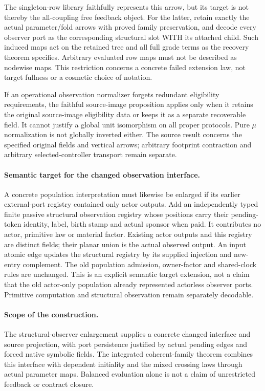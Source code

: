\documentclass{article}
\begin{document}
The singleton-row library faithfully represents this arrow, but its target is not thereby the all-coupling free feedback object. For the latter, retain exactly the actual parameter/fold arrows with proved family preservation, and decode every observer port as the corresponding structural slot WITH its attached child. Such induced maps act on the retained tree and all full grade terms as the recovery theorem specifies. Arbitrary evaluated row maps must not be described as nodewise maps. This restriction concerns a concrete failed extension law, not target fullness or a cosmetic choice of notation.

If an operational observation normalizer forgets redundant eligibility requirements, the faithful source-image proposition applies only when it retains the original source-image eligibility data or keeps it as a separate recoverable field. It cannot justify a global unit isomorphism on all proper protocols. Pure $\mu$ normalization is not globally inverted either. The source result concerns the specified original fields and vertical arrows; arbitrary footprint contraction and arbitrary selected-controller transport remain separate.

\paragraph{Semantic target for the changed observation interface.}
A concrete population interpretation must likewise be enlarged if its earlier external-port registry contained only actor outputs. Add an independently typed finite passive structural observation registry whose positions carry their pending-token identity, label, birth stamp and actual sponsor when paid. It contributes no actor, primitive law or material factor. Existing actor outputs and this registry are distinct fields; their planar union is the actual observed output. An input atomic edge updates the structural registry by its supplied injection and new-entry complement. The old population admission, owner-factor and shared-clock rules are unchanged. This is an explicit semantic target extension, not a claim that the old actor-only population already represented actorless observer ports. Primitive computation and structural observation remain separately decodable.

\paragraph{Scope of the construction.} The structural-observer enlargement supplies a concrete changed interface and source projection, with port persistence justified by actual pending edges and forced native symbolic fields. The integrated coherent-family theorem combines this interface with dependent initiality and the mixed crossing laws through actual parameter maps. Balanced evaluation alone is not a claim of unrestricted feedback or contract closure.
\end{document}
